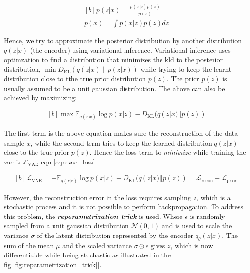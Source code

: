 \begin{equation}\label{eqn:pofx}
    \begin{gathered}[b]
        p(z | x)=\frac{p(x | z) p(z)}{p(x)} \\
        p(x)=\int p(x | z) p(z) dz
    \end{gathered}
\end{equation}

Hence, we try to approximate the posterior distribution by another distribution $q(z|x)$ (the encoder) using variational inference. Variational inference uses optimzation to find a distribution that minimizes the \ac{kld} to the posterior distribution, $\min D_{\mathrm{KL}}(q(z| x) \| p(z| x))$ while trying to keep the learnt distribution close to tthe true prior distribution $p(z)$\cite{variational_inference}. The prior $p(z)$ is usually assumed to be a unit gaussian distribution. The above can also be achieved by maximizing:

\begin{equation} \label{eqn:minKLd}
    \begin{gathered}[b]
        \max \mathbb{E}_{q(z | x)} \log p(x | z) - D_{\mathrm{KL}}(q(z | x) || p(z))
    \end{gathered}
\end{equation}

The first term is the above equation makes sure the reconstruction of the data sample $x$, while the second term tries to keep the learned distribution $q(z|x)$ close to the true prior $p(z)$. Hence the loss term to \textit{minimize} while training the \ac{vae} is $\mathcal{L}_{\mathrm{VAE}}$ eqn \ref{eqn:vae_loss}.

\begin{equation} \label{eqn:vae_loss}
    \begin{gathered}[b]
        \mathcal{L}_{\mathrm{VAE}}=-\mathbb{E}_{q(z | x)} \log p(x | z) + D_{\mathrm{KL}}(q(z | x) || p(z)) =\mathcal{L}_{\text {recon}} +\mathcal{L}_{\text {prior }}
    \end{gathered}
\end{equation}

However, the reconstruction error in the loss requires sampling $z$, which is a stochastic process and it is not possible to perform backpropagation. To address this problem, the \textbf{\textit{reparametrization trick}} is used. Where $\epsilon$ is randomly sampled from a unit gaussian distribution $\mathcal{N}(0,1)$ and is used to scale the variance $\sigma$ of the latent distribution represented by the encoder $q_{\theta}(z|x)$. The sum of the mean $\mu$ and the scaled variance $\sigma \odot \epsilon$ gives $z$, which is now differentiable while being stochastic as illustrated in the fig[\ref{fig:reparametrization_trick}].

